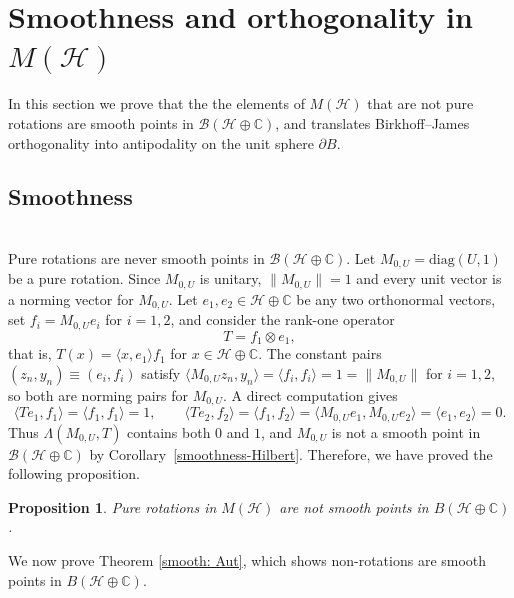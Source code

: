 \documentclass[12pt]{amsart}
\newtheorem{proposition}[theorem]{Proposition}
\theoremstyle{definition}
\renewcommand{\H}{\mathcal{H}}
\begin{document}
\section{Smoothness and orthogonality in $M(\H)$}\label{sec:proof}

\noindent In this section we prove that the the elements of $M(\mathcal{H})$ that are not pure rotations are smooth points in $\mathcal{B}(\mathcal{H}\oplus\mathbb{C})$, and translates Birkhoff--James orthogonality into antipodality on the unit sphere $\partial B$.

\subsection{Smoothness}\hfill\\

\noindent Pure rotations are never smooth points in 
$\mathcal{B}(\mathcal{H}\oplus\mathbb{C})$. Let 
$M_{0,U} = \mathrm{diag}(U,1)$ be a pure rotation. Since 
$M_{0,U}$ is unitary, $\|M_{0,U}\| = 1$ and every unit vector 
is a norming vector for $M_{0,U}$. Let $e_1, e_2 \in 
\mathcal{H}\oplus\mathbb{C}$ be any two orthonormal vectors, 
set $f_i = M_{0,U}e_i$ for $i = 1, 2$, and consider the 
rank-one operator
\[
T = f_1 \otimes e_1,
\]
that is, $T(x) = \langle x, e_1\rangle f_1$ for $x \in 
\mathcal{H}\oplus\mathbb{C}$. The constant pairs 
$(z_n, y_n) \equiv (e_i, f_i)$ satisfy 
$\langle M_{0,U}z_n, y_n\rangle = \langle f_i, f_i\rangle = 1 
= \|M_{0,U}\|$ for $i = 1, 2$, so both are norming pairs for 
$M_{0,U}$. A direct computation gives
\[
\langle Te_1, f_1\rangle = \langle f_1, f_1\rangle = 1, 
\qquad
\langle Te_2, f_2\rangle = \langle f_1, f_2\rangle 
= \langle M_{0,U}e_1, M_{0,U}e_2\rangle 
= \langle e_1, e_2\rangle = 0.
\]
Thus $\Lambda(M_{0,U}, T)$ contains both $0$ and $1$, and 
$M_{0,U}$ is not a smooth point in 
$\mathcal{B}(\mathcal{H}\oplus\mathbb{C})$ by 
Corollary~\ref{smoothness-Hilbert}. Therefore, we have proved the following proposition.

\begin{proposition}
Pure rotations in $M \left(\H \right)$ are not smooth points in $B \left(\H\oplus \mathbb{C} \right)$.
\end{proposition}

\noindent We now prove Theorem \ref{smooth: Aut}, which shows non-rotations are smooth points in $B \left(\H\oplus \mathbb{C} \right)$.
\end{document}
